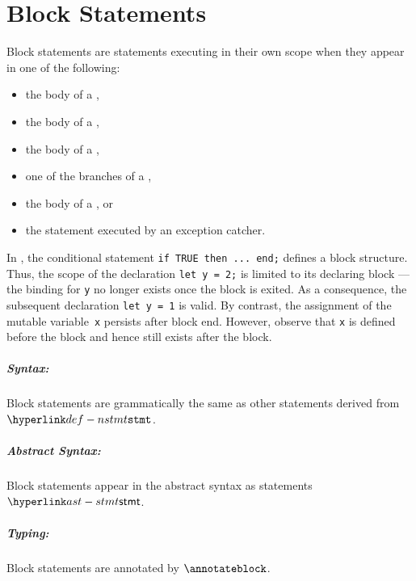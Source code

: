 \chapter{Block Statements\label{chap:BlockStatements}}
Block statements are statements executing in their own scope when they appear
in one of the following:
\begin{itemize}
  \item the body of a \whilestatementterm,
  \item the body of a \repeatstatementsterm,
  \item the body of a \forstatementterm,
  \item one of the branches of a \conditionalstatementterm,
  \item the body of a \trystatementterm, or
  \item the statement executed by an exception catcher.
\end{itemize}

In ,
the conditional statement \verb|if TRUE then ... end;| defines a
block structure. Thus, the scope of the declaration \texttt{let y = 2;} is
limited to its declaring block --- the binding for \texttt{y} no longer exists
once the block is exited. As a consequence, the subsequent declaration
\texttt{let y = 1} is valid.  By contrast, the assignment of the mutable
variable~\texttt{x} persists after block end. However, observe that \texttt{x}
is defined before the block and hence still exists after the block.

\ChapterOutline

\paragraph{Syntax:} Block statements are grammatically the same as other statements
derived from $\Nstmt$.

\paragraph{Abstract Syntax:} Block statements appear in the abstract syntax
as statements $\stmt$.

\paragraph{Typing:} Block statements are annotated by $\annotateblock$.

